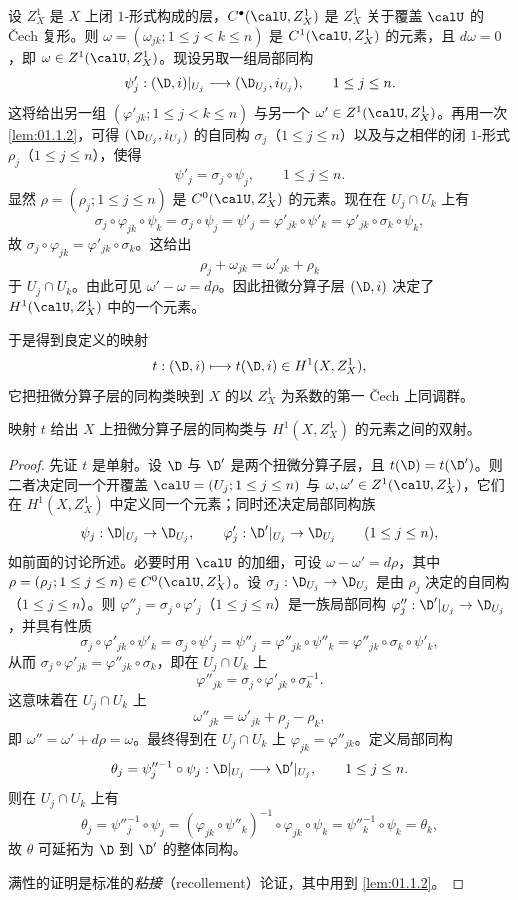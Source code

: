 设 $Z^1_X$ 是 $X$ 上闭 $1$-形式构成的层，$C^\bullet(\calU,Z^1_X)$ 是 $Z^1_X$ 关于覆盖 $\calU$ 的 \v{C}ech 复形。则 $\omega=(\omega_{jk};1\le j<k\le n)$ 是 $C^1(\calU,Z^1_X)$ 的元素，且 $d\omega=0$，即 $\omega\in Z^1(\calU,Z^1_X)$。现设另取一组局部同构
$$\psi'_j:(\D,i)|_{U_j}\longrightarrow(\D_{U_j},i_{U_j}),\qquad 1\le j\le n.$$
这将给出另一组 $(\varphi'_{jk};1\le j<k\le n)$ 与另一个 $\omega'\in Z^1(\calU,Z^1_X)$。再用一次 \ref{lem:01.1.2}，可得 $(\D_{U_j},i_{U_j})$ 的自同构 $\sigma_j$（$1\le j\le n$）以及与之相伴的闭 $1$-形式 $\rho_j$（$1\le j\le n$），使得
$$\psi'_j=\sigma_j\circ\psi_j,\qquad 1\le j\le n.$$
显然 $\rho=(\rho_j;1\le j\le n)$ 是 $C^0(\calU,Z^1_X)$ 的元素。现在在 $U_j\cap U_k$ 上有
$$\sigma_j\circ\varphi_{jk}\circ\psi_k=\sigma_j\circ\psi_j=\psi'_j=\varphi'_{jk}\circ\psi'_k=\varphi'_{jk}\circ\sigma_k\circ\psi_k,$$
故 $\sigma_j\circ\varphi_{jk}=\varphi'_{jk}\circ\sigma_k$。这给出
$$\rho_j+\omega_{jk}=\omega'_{jk}+\rho_k$$
于 $U_j\cap U_k$。由此可见 $\omega'-\omega=d\rho$。因此扭微分算子层 $(\D,i)$ 决定了 $H^1(\calU,Z^1_X)$ 中的一个元素。

于是得到良定义的映射
$$t:(\D,i)\longmapsto t(\D,i)\in H^1(X,Z^1_X),$$
它把扭微分算子层的同构类映到 $X$ 的以 $Z^1_X$ 为系数的第一 \v{C}ech 上同调群。

\begin{theorem}\label{thm:01.1.3}
映射 $t$ 给出 $X$ 上扭微分算子层的同构类与 $H^1(X,Z^1_X)$ 的元素之间的双射。
\end{theorem}

\begin{proof}
先证 $t$ 是单射。设 $\D$ 与 $\D'$ 是两个扭微分算子层，且 $t(\D)=t(\D')$。则二者决定同一个开覆盖 $\calU=(U_j;1\le j\le n)$ 与 $\omega,\omega'\in Z^1(\calU,Z^1_X)$，它们在 $H^1(X,Z^1_X)$ 中定义同一个元素；同时还决定局部同构族
$$\psi_j:\D|_{U_j}\to\D_{U_j},\qquad \varphi'_j:\D'|_{U_j}\to\D_{U_j}\qquad (1\le j\le n),$$
如前面的讨论所述。必要时用 $\calU$ 的加细，可设 $\omega-\omega'=d\rho$，其中 $\rho=(\rho_j;1\le j\le n)\in C^0(\calU,Z^1_X)$。设 $\sigma_j:\D_{U_j}\to\D_{U_j}$ 是由 $\rho_j$ 决定的自同构（$1\le j\le n$）。则 $\varphi''_j=\sigma_j\circ\varphi'_j$（$1\le j\le n$）是一族局部同构 $\varphi''_j:\D'|_{U_j}\to\D_{U_j}$，并具有性质
$$\sigma_j\circ\varphi'_{jk}\circ\psi'_k=\sigma_j\circ\psi'_j=\psi''_j=\varphi''_{jk}\circ\psi''_k=\varphi''_{jk}\circ\sigma_k\circ\psi'_k,$$
从而 $\sigma_j\circ\varphi'_{jk}=\varphi''_{jk}\circ\sigma_k$，即在 $U_j\cap U_k$ 上
$$\varphi''_{jk}=\sigma_j\circ\varphi'_{jk}\circ\sigma_k^{-1}.$$
这意味着在 $U_j\cap U_k$ 上
$$\omega''_{jk}=\omega'_{jk}+\rho_j-\rho_k,$$
即 $\omega''=\omega'+d\rho=\omega$。最终得到在 $U_j\cap U_k$ 上 $\varphi_{jk}=\varphi''_{jk}$。定义局部同构
$$\theta_j=\psi''^{-1}_j\circ\psi_j:\D|_{U_j}\longrightarrow\D'|_{U_j},\qquad 1\le j\le n.$$
则在 $U_j\cap U_k$ 上有
$$\theta_j=\psi''^{-1}_j\circ\psi_j=(\varphi_{jk}\circ\psi''_k)^{-1}\circ\varphi_{jk}\circ\psi_k=\psi''^{-1}_k\circ\psi_k=\theta_k,$$
故 $\theta$ 可延拓为 $\D$ 到 $\D'$ 的整体同构。

满性的证明是标准的\emph{粘接}（recollement）论证，其中用到 \ref{lem:01.1.2}。
\end{proof}

